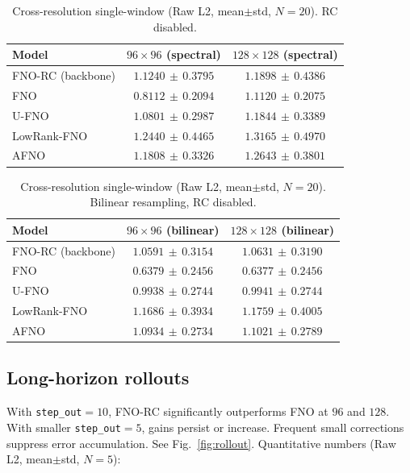 \documentclass[11pt]{article}
\begin{document}
\begin{table}[h]
  \centering
  \small
  \caption{Cross-resolution single-window (Raw L2, mean$\pm$std, $N=20$). RC disabled.}
  \begin{tabular}{lcc}
    \toprule
    Model & $96\times96$ (spectral) & $128\times128$ (spectral) \\
    \midrule
    FNO-RC (backbone) & $1.1240\,\pm\,0.3795$ & $1.1898\,\pm\,0.4386$ \\
    FNO               & $\mathbf{0.8112}\,\pm\,0.2094$ & $\mathbf{1.1120}\,\pm\,0.2075$ \\
    U-FNO             & $1.0801\,\pm\,0.2987$ & $1.1844\,\pm\,0.3389$ \\
    LowRank-FNO       & $1.2440\,\pm\,0.4465$ & $1.3165\,\pm\,0.4970$ \\
    AFNO              & $1.1808\,\pm\,0.3326$ & $1.2643\,\pm\,0.3801$ \\
    \bottomrule
  \end{tabular}
  \label{tab:crossres_spectral}
\end{table}

\begin{table}[h]
  \centering
  \small
  \caption{Cross-resolution single-window (Raw L2, mean$\pm$std, $N=20$). Bilinear resampling, RC disabled.}
  \begin{tabular}{lcc}
    \toprule
    Model & $96\times96$ (bilinear) & $128\times128$ (bilinear) \\
    \midrule
    FNO-RC (backbone) & $1.0591\,\pm\,0.3154$ & $1.0631\,\pm\,0.3190$ \\
    FNO               & $\mathbf{0.6379}\,\pm\,0.2456$ & $\mathbf{0.6377}\,\pm\,0.2456$ \\
    U-FNO             & $0.9938\,\pm\,0.2744$ & $0.9941\,\pm\,0.2744$ \\
    LowRank-FNO       & $1.1686\,\pm\,0.3934$ & $1.1759\,\pm\,0.4005$ \\
    AFNO              & $1.0934\,\pm\,0.2734$ & $1.1021\,\pm\,0.2789$ \\
    \bottomrule
  \end{tabular}
  \label{tab:crossres_bilinear}
\end{table}

\subsection{Long-horizon rollouts}
With \texttt{step\_out}$=10$, FNO-RC significantly outperforms FNO at $96$ and $128$. With smaller \texttt{step\_out}$=5$, gains persist or increase. Frequent small corrections suppress error accumulation. See Fig.~\ref{fig:rollout}. Quantitative numbers (Raw L2, mean$\pm$std, $N=5$):
\end{document}
